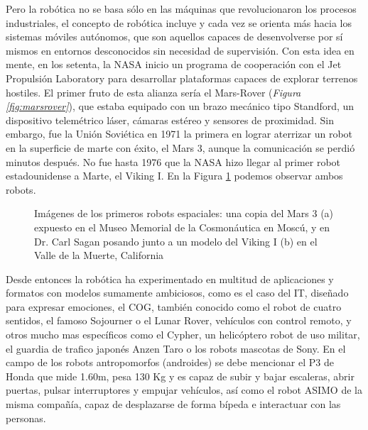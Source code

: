 Pero la robótica no se basa sólo en las máquinas que revolucionaron los procesos industriales, el concepto de robótica incluye y cada vez se orienta más hacia los sistemas móviles autónomos, que son aquellos capaces de desenvolverse por sí mismos en entornos desconocidos sin necesidad de supervisión. Con esta idea en mente, en los setenta, la NASA inicio un programa de cooperación con el Jet Propulsión Laboratory para desarrollar plataformas capaces de explorar terrenos hostiles. El primer fruto de esta alianza sería el Mars-Rover (\textit{Figura \ref{fig:marsrover}}), que estaba equipado con un brazo mecánico tipo Standford, un dispositivo telemétrico láser, cámaras estéreo y sensores de proximidad. Sin embargo, fue la Unión Soviética en 1971 la primera en lograr aterrizar un robot en la superficie de marte con éxito, el Mars 3, aunque la comunicación se perdió minutos después. No fue hasta 1976 que la NASA hizo llegar al primer robot estadounidense a Marte, el Viking I. En la Figura \ref{fig:vikingmars} podemos observar ambos robots.

\begin{figure}[t]
	\centering
	\hspace{0.05\textwidth}
	\caption[Los primeros robots espaciales, el Mars 3 y el Viking I]{Imágenes de los primeros robots espaciales: una copia del Mars 3 (a) expuesto en el Museo Memorial de la Cosmonáutica en Moscú, y en Dr. Carl Sagan posando junto a un modelo del Viking I (b) en el Valle de la Muerte, California} \label{fig:vikingmars}
\end{figure}

Desde entonces la robótica ha experimentado en multitud de aplicaciones y formatos con modelos sumamente ambiciosos, como es el caso del IT, diseñado para expresar emociones, el COG, también conocido como el robot de cuatro sentidos, el famoso Sojourner o el Lunar Rover, vehículos con control remoto, y otros mucho mas específicos como el Cypher, un helicóptero robot de uso militar, el guardia de trafico japonés Anzen Taro o los robots mascotas de Sony. En el campo de los robots antropomorfos (androides) se debe mencionar el P3 de Honda que mide 1.60m, pesa 130 Kg y es capaz de subir y bajar escaleras, abrir puertas, pulsar interruptores y empujar vehículos, así como el robot ASIMO de la misma compañía, capaz de desplazarse de forma bípeda e interactuar con las personas.

